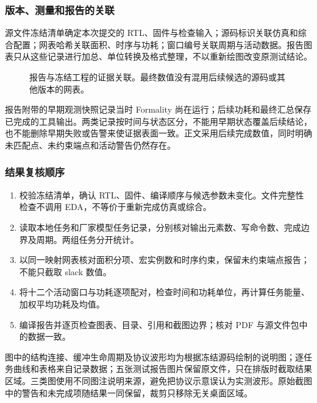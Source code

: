 \subsubsection{版本、测量和报告的关联}
源文件冻结清单确定本次提交的 RTL、固件与检查输入；源码标识关联仿真和综合配置；网表哈希关联面积、时序与功耗；窗口编号关联周期与活动数据。报告图表只从这些记录进行加总、单位转换及格式整理，不以重新绘图改变原测试结论。

\begin{figure}[H]\centering
{}
\caption{报告与冻结工程的证据关联。最终数值没有混用后续候选的源码或其他版本的网表。}
\end{figure}

报告附带的早期观测快照记录当时 Formality 尚在运行；后续功耗和最终汇总保存已完成的工具输出。两类记录按时间与状态区分，不能用早期状态覆盖后续结论，也不能删除早期失败或告警来使证据表面一致。正文采用后续完成数值，同时明确未匹配点、未约束端点和活动警告仍然存在。

\subsubsection{结果复核顺序}
\begin{enumerate}
\item 校验冻结清单，确认 RTL、固件、编译顺序与候选参数未变化。文件完整性检查不调用 EDA，不等价于重新完成仿真或综合。
\item 读取本地任务和厂家模型任务记录，分别核对输出元素数、写命令数、完成边界及周期。两组任务分开统计。
\item 以同一映射网表核对面积分项、宏实例数和时序约束，保留未约束端点报告；不能只截取 slack 数值。
\item 将十二个活动窗口与功耗逐项配对，检查时间和功耗单位，再计算任务能量、加权平均功耗及均值。
\item 编译报告并逐页检查图表、目录、引用和截图边界；核对 PDF 与源文件包中的数据一致。
\end{enumerate}

图中的结构连接、缓冲生命周期及协议波形均为根据冻结源码绘制的说明图；逐任务曲线和表格来自记录数据；五张测试报告图片保留原文件，只在排版时截取结果区域。三类图使用不同图注说明来源，避免把协议示意误认为实测波形。原始截图中的警告和未完成项随结果一同保留，裁剪只移除无关桌面区域。
